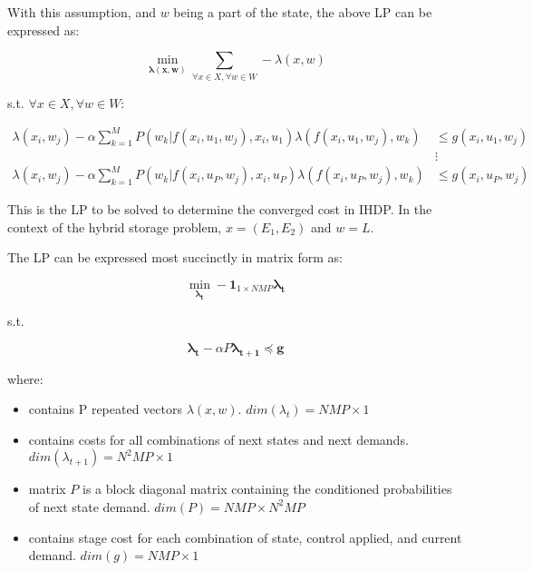 \documentclass{article}
\begin{document}
	With this assumption, and $w$ being a part of the state, the above LP can be expressed as:
	
	\begin{equation}
	\min_{\boldsymbol{\lambda(x,w)}} \sum_{\forall x \in X,\forall w \in W} -\lambda(x,w)
	\end{equation}
	
	s.t. $\forall x \in X,\forall w \in W$:
	
	\begin{align*}
	\lambda(x_{i},w_{j})-\alpha\sum_{k=1}^{M}P(w_{k} | f(x_{i},u_{1},w_{j}),x_{i},u_{1})\lambda(f(x_{i},u_{1},w_{j}),w_{k}) &\leq g(x_{i},u_{1},w_{j}) \\
	&\vdots\\
	\lambda(x_{i},w_{j})-\alpha\sum_{k=1}^{M}P(w_{k} | f(x_{i},u_{P},w_{j}),x_{i},u_{P})\lambda(f(x_{i},u_{P},w_{j}),w_{k}) &\leq g(x_{i},u_{P},w_{j})
	\end{align*}
	
	This is the LP to be solved to determine the converged cost in IHDP. In the context of the hybrid storage problem, $x=(E_{1},E_{2})$ and $w=L$.
	
	The LP can be expressed most succinctly in matrix form as:
	
	\begin{equation}
	\min_{\boldsymbol{\lambda_{t}}} -\boldsymbol{1}_{1\times NMP} \boldsymbol{\lambda_{t}}
	\end{equation}
	
	s.t.
	
	\begin{displaymath} 
	\boldsymbol{\lambda_{t}}-\alpha P\boldsymbol{\lambda_{t+1}} \preceq \boldsymbol{g}
	\end{displaymath}
	
	where:
	
	\begin{itemize}
		\item {} contains P repeated vectors $\lambda(x,w)$. $dim(\lambda_{t})=NMP\times 1$
		
		\item {} contains costs for all combinations of next states and next demands. $dim(\lambda_{t+1})=N^{2}MP\times 1$
		
		\item matrix $P$ is a block diagonal  matrix containing the conditioned probabilities of next state demand. $dim(P)=NMP\times N^{2}MP$
		
		\item {} contains stage cost for each combination of state, control applied, and current demand. $dim(g)=NMP\times 1$
	\end{itemize}
	
\end{document}
